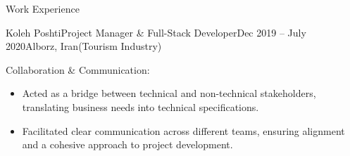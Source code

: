 \documentclass[]{kyvernitis-resume}
\begin{document}
\begin{section}{Work Experience}
\begin{subsection}{Koleh Poshti}{Project Manager \& Full-Stack Developer}{Dec 2019 -- July 2020}{Alborz, Iran}{(Tourism Industry)}
        	\item Collaboration \& Communication:
	\begin{itemize}
	\item Acted as a bridge between technical and non-technical stakeholders, translating business needs into technical specifications.
	\item Facilitated clear communication across different teams, ensuring alignment and a cohesive approach to project development.
	\end{itemize}


    \end{subsection}

\hfill


\end{section}
\end{document}
